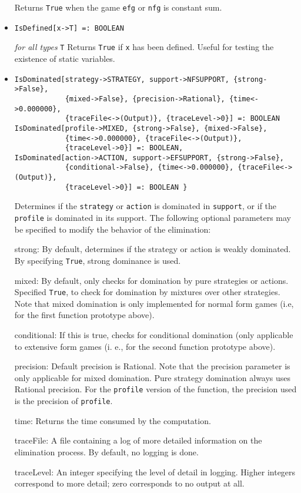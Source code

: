 \begin{itemize}
\bd
Returns \verb+True+ when the game \verb+efg+ or \verb+nfg+ is constant sum.
\ed

\item{}
\protect \large \begin{verbatim}
IsDefined[x->T] =: BOOLEAN
\end{verbatim}\normalsize

{\it for all types} {\tt T}
\bd
Returns \verb+True+ if \verb+x+ has been defined.  Useful for testing
the existence of static variables.
\ed

\item{}
\protect \large \begin{verbatim}
IsDominated[strategy->STRATEGY, support->NFSUPPORT, {strong->False}, 
            {mixed->False}, {precision->Rational}, {time<->0.000000}, 
            {traceFile<->(Output)}, {traceLevel->0}] =: BOOLEAN
IsDominated[profile->MIXED, {strong->False}, {mixed->False}, 
            {time<->0.000000}, {traceFile<->(Output)}, 
            {traceLevel->0}] =: BOOLEAN,
IsDominated[action->ACTION, support->EFSUPPORT, {strong->False}, 
            {conditional->False}, {time<->0.000000}, {traceFile<->(Output)}, 
            {traceLevel->0}] =: BOOLEAN }
\end{verbatim}\normalsize

\bd Determines if the \verb+strategy+ or \verb+action+ is dominated in
\verb+support+, or if the \verb+profile+ is dominated in its
support. The following optional parameters may be specified to modify
the behavior of the elimination:

\bd
\item [strong:] By default, determines if the strategy or action is
weakly dominated.  By specifying \verb+True+, strong dominance is
used.
\item [mixed:] By default, only checks for domination by pure
strategies or actions.  Specified \verb+True+, to check for domination
by mixtures over other strategies.  Note that mixed domination is only
implemented for normal form games (i.e, for the first function
prototype above).
\item [conditional:] If this is true, checks for conditional domination (only applicable to extensive form games (i. e., for the second function prototype above).
\item [precision:] Default precision is Rational.  Note that the precision
parameter is only applicable for mixed domination.  Pure strategy
domination always uses Rational precision.  For the \verb+profile+ version of the 
function, the precision used is the precision of \verb+profile+.  
\item [time:] Returns the time consumed by the computation.
\item [traceFile:] A file containing a log of more detailed information
on the elimination process.  By default, no logging is done.
\item [traceLevel:] An integer specifying the level of detail in logging.
Higher integers correspond to more detail; zero corresponds to no output
at all.
\ed
\ed


\end{itemize}
